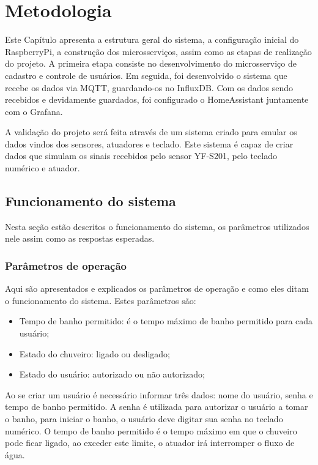 \chapter{Metodologia}

Este Capítulo apresenta a estrutura geral do sistema, a configuração inicial do RaspberryPi, a construção dos microsserviços, assim como as etapas de realização do projeto. A
primeira etapa consiste no desenvolvimento do microsserviço de cadastro e controle de usuários. Em seguida, foi desenvolvido o sistema que recebe os dados via MQTT, guardando-os no InfluxDB. Com os dados sendo recebidos e devidamente guardados, foi configurado o HomeAssistant juntamente com o Grafana.

A validação do projeto será feita através de um sistema criado para emular os dados vindos dos sensores, atuadores e teclado. Este sistema é capaz de criar dados que simulam os sinais recebidos pelo sensor YF-S201, pelo teclado numérico e atuador.

\section{Funcionamento do sistema}

Nesta seção estão descritos o funcionamento do sistema, os parâmetros utilizados nele assim como as respostas esperadas.

\subsection{Parâmetros de operação}

Aqui são apresentados e explicados os parâmetros de operação e como eles ditam o funcionamento do sistema. Estes parâmetros são:

\begin{itemize}
	\item Tempo de banho permitido: é o tempo máximo de banho permitido para cada usuário;
	\item Estado do chuveiro: ligado ou desligado;
	\item Estado do usuário: autorizado ou não autorizado;
\end{itemize}

Ao se criar um usuário é necessário informar três dados: nome do usuário, senha e tempo de banho permitido. A senha é utilizada para autorizar o usuário a tomar o banho, para iniciar o banho, o usuário deve digitar sua senha no teclado numérico. O tempo de banho permitido é o tempo máximo em que o chuveiro pode ficar ligado, ao exceder este limite, o atuador irá interromper o fluxo de água.

